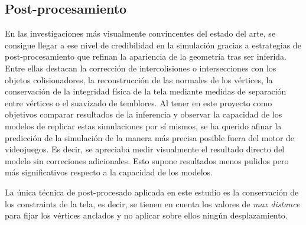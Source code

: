 \subsection{Post-procesamiento}
En las investigaciones más visualmente convincentes del estado del arte, se consigue llegar a ese nivel de credibilidad en la simulación gracias a estrategias de post-procesamiento que refinan la apariencia de la geometría tras ser inferida. Entre ellas destacan la corrección de intercolisiones o intersecciones con los objetos colisionadores, la reconstrucción de las normales de los vértices, la conservación de la integridad física de la tela mediante medidas de separación entre vértices o el suavizado de temblores. Al tener en este proyecto como objetivos comparar resultados de la inferencia y observar la capacidad de los modelos de replicar estas simulaciones por sí mismos, se ha querido afinar la predicción de la simulación de la manera más precisa posible fuera del motor de videojuegos. Es decir, se apreciaba medir visualmente el resultado directo del modelo sin correciones adicionales. Esto supone resultados menos pulidos pero más significativos respecto a la capacidad de los modelos. \newline

La única técnica de post-procesado aplicada en este estudio es la conservación de los constraints de la tela, es decir, se tienen en cuenta los valores de \textit{max distance} para fijar los vértices anclados y no aplicar sobre ellos ningún desplazamiento.
